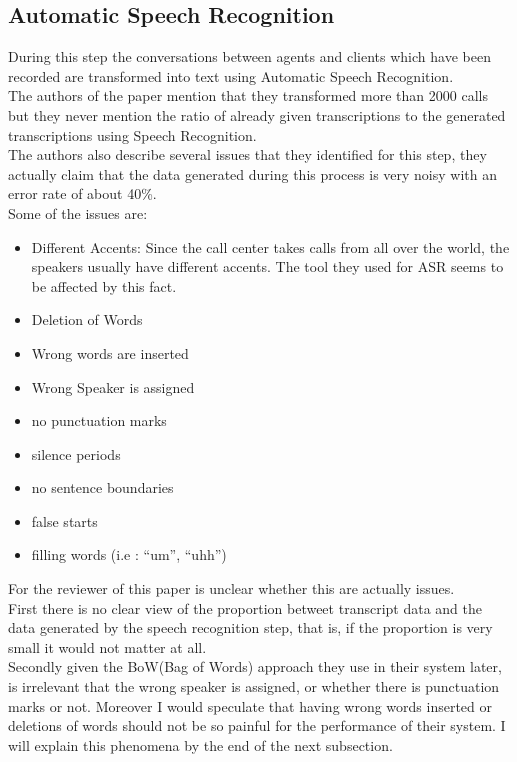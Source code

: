 \documentclass[4pt,a4paper,twocolumn]{article}
\begin{document}
\subsection{Automatic Speech Recognition}
		
During this step the conversations between agents and clients which have been recorded are transformed into text using Automatic Speech Recognition.\\
The authors of the paper mention that they transformed more than 2000 calls  but they never mention the ratio of already given transcriptions to the generated transcriptions using Speech Recognition.\\
The authors also describe several issues that they identified for this step, they actually claim that the data generated during this process is very noisy with an error rate of about 40\%.\\
Some of the issues are:
\begin{itemize}

	\item Different Accents: Since the call center takes calls from all over the world, the speakers usually have different accents. The tool they used for ASR seems to be affected by this fact.
	
	\item Deletion of Words 
	
	\item Wrong words are inserted
	
	\item Wrong Speaker is assigned
	
	\item no punctuation marks
	
	\item silence periods
	
	\item no sentence boundaries
	
	\item false starts
	
	\item filling words (i.e : ``um'', ``uhh'')
\end{itemize}

For the reviewer of this paper is unclear whether this are actually issues.\\
First there is no clear view of the proportion betweet transcript data and the data generated by the speech recognition step, that is, if the proportion is very small it would not matter at all.\\
Secondly given the BoW(Bag of Words) approach they use in their system later, is irrelevant that the wrong speaker is assigned, or whether there is punctuation marks or not. Moreover I would speculate that having wrong words inserted or deletions of words should not be so painful for the performance of their system. I will explain this phenomena by the end of the next subsection.
\end{document}
